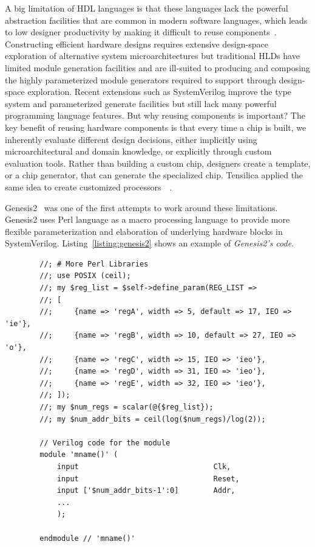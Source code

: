 A big limitation of HDL languages is that these languages lack the powerful abstraction facilities that
are common in modern software languages, which leads to low designer productivity by making it difficult to reuse components~\cite{shacham_rethinking_2010}.
Constructing efficient hardware designs requires extensive design-space exploration of alternative system microarchitectures but traditional HLDs have limited module generation facilities and are ill-suited to producing and composing the highly parameterized module generators required to support through design-space exploration.
Recent extensions such as SystemVerilog improve the type system and parameterized generate facilities but still lack many powerful programming language features.
But why reusing components is important?
The key benefit of reusing hardware components is that every time a chip is built, we inherently evaluate different design decisions, either implicitly using microarchitectural and domain knowledge, or explicitly through custom evaluation tools.
Rather than building a custom chip, designers create a template, or a chip generator, that can generate the specialized chip. Tensilica applied the same idea to create customized processors~\cite{tensillica}~\cite{tensillica}.

Genesis2~\cite{genesis2} was one of the first attempts to work around these limitations. Genesis2 uses Perl language as a macro processing language to provide more flexible parameterization and elaboration of underlying hardware blocks in SystemVerilog. Listing~\ref{listing:genesis2} shows an example of \textit{Genesis2's code}.

\begin{listing}[ht]
    \begin{verbatim}
        //; # More Perl Libraries
        //; use POSIX (ceil);
        //; my $reg_list = $self->define_param(REG_LIST => 
        //; [	
        //;     {name => 'regA', width => 5, default => 17, IEO => 'ie'},
        //;     {name => 'regB', width => 10, default => 27, IEO => 'o'},
        //;     {name => 'regC', width => 15, IEO => 'ieo'},
        //;     {name => 'regD', width => 31, IEO => 'ieo'},
        //;     {name => 'regE', width => 32, IEO => 'ieo'},
        //; ]);
        //; my $num_regs = scalar(@{$reg_list});
        //; my $num_addr_bits = ceil(log($num_regs)/log(2));

        // Verilog code for the module
        module 'mname()' (
            input                               Clk,
            input                               Reset,
            input ['$num_addr_bits-1':0]        Addr,
            ...
            );

        endmodule // 'mname()'
    \end{verbatim}
    \caption[Caption for LOF]%
    {Genesis2 code example, combining SystemVerilog and Perl~\cite{genesis2}}
    \label{listing:genesis2}
\end{listing}

